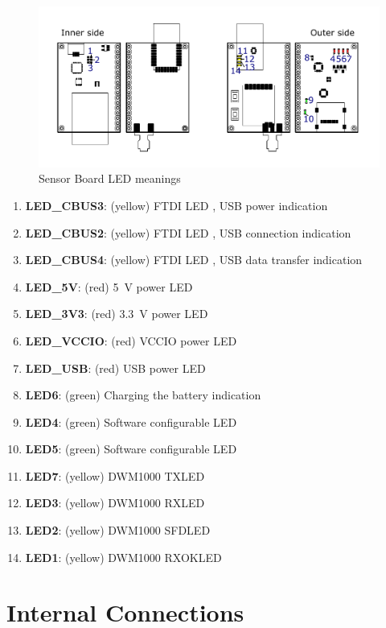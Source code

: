 \begin{figure}[H]
	\centering
	\includegraphics[scale=1]{img/LEDmeanings.pdf}
	\caption{Sensor Board LED meanings}
	\label{fig:LEDmeaning}
\end{figure}

\begin{enumerate}
	\item \textbf{LED\_CBUS3}: (yellow) FTDI LED \cite{FTDI}, USB power indication
	\item \textbf{LED\_CBUS2}: (yellow) FTDI LED \cite{FTDI}, USB connection indication
	\item \textbf{LED\_CBUS4}: (yellow) FTDI LED \cite{FTDI}, USB data transfer indication
	\item \textbf{LED\_5V}: (red) \SI{5}{V} power LED
	\item \textbf{LED\_3V3}: (red) \SI{3.3}{V} power LED
	\item \textbf{LED\_VCCIO}: (red) VCCIO power LED
	\item \textbf{LED\_USB}: (red) USB power LED
	\item \textbf{LED6}: (green) Charging the battery indication
	\item \textbf{LED4}: (green) Software configurable LED
	\item \textbf{LED5}: (green) Software configurable LED
	\item \textbf{LED7}: (yellow) DWM1000 TXLED \cite{DWM1000}
	\item \textbf{LED3}: (yellow) DWM1000 RXLED \cite{DWM1000}
	\item \textbf{LED2}: (yellow) DWM1000 SFDLED \cite{DWM1000}
	\item \textbf{LED1}: (yellow) DWM1000 RXOKLED \cite{DWM1000}
\end{enumerate}

\section{Internal Connections}


